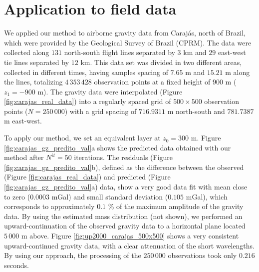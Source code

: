 \section{Application to field data}

We applied our method to airborne gravity data from Caraj{\'a}s, north of Brazil, which were provided by 
the Geological Survey of Brazil (CPRM). The data were collected along $131$ north-south flight lines separated 
by $3$ km and $29$ east-west tie lines separated by $12$ km.
This data set was divided in two different areas, collected in different times, having samples spacing of 
$7.65$ m and $15.21$ m along the lines, totalizing  $4\,353\,428$ observation points at a fixed height 
of $900$ m ($z_{1} = -900$ m). 
The gravity data were interpolated (Figure \ref{fig:carajas_real_data}) into a regularly spaced grid of 
$500 \times 500$ observation points ($N = 250\,000$) with a grid spacing of $716.9311$ m north-south and 
$781.7387$ m east-west.

To apply our method, we set an equivalent layer at $z_{0} = 300$ m. 
Figure \ref{fig:carajas_gz_predito_val}a shows the predicted data obtained with our method after 
$N^{it} = 50$ iterations.
The residuals (Figure \ref{fig:carajas_gz_predito_val}b), defined as the difference between the observed 
(Figure \ref{fig:carajas_real_data}) and predicted (Figure \ref{fig:carajas_gz_predito_val}a) data, show a 
very good data fit with mean close to zero ($0.0003$ mGal) and small standard deviation ($0.105$ mGal), 
which corresponds to approximately $0.1$ \% of the maximum amplitude of the gravity data.
By using the estimated mass distribution (not shown), we performed an upward-continuation of the 
observed gravity data to a horizontal plane located $5\,000$ m above. Figure \ref{fig:up2000_carajas_500x500} 
shows a very consistent upward-continued gravity data, with a clear attenuation of the short 
wavelengths. By using our approach, the processing of the $250\,000$ observations took only 
$0.216$ seconds.